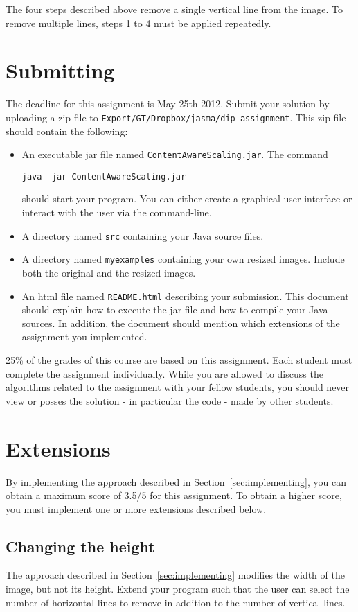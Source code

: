 \documentclass{article}
\begin{document}
The four steps described above remove a single vertical line from the image. To remove multiple lines, steps 1 to 4 must be applied repeatedly.

\section{Submitting}
The deadline for this assignment is May 25th 2012. Submit your solution by uploading a zip file to \texttt{Export/GT/Dropbox/jasma/dip-assignment}. This zip file should contain the following:
\begin{itemize}
  \item An executable jar file named \texttt{ContentAwareScaling.jar}. The command
\begin{verbatim}
java -jar ContentAwareScaling.jar
\end{verbatim}
should start your program. You can either create a graphical user interface or interact with the user via the command-line.
  \item A directory named \texttt{src} containing your Java source files.
  \item A directory named \texttt{myexamples} containing your own resized images. Include both the original and the resized images. 
  \item An html file named \texttt{README.html} describing your submission. This document should explain how to execute the jar file and how to compile your Java sources. In addition, the document should mention which extensions of the assignment you implemented. 
\end{itemize}

25\% of the grades of this course are based on this assignment. Each student must complete the assignment individually. While you are allowed to discuss the algorithms related to the assignment with your fellow students, you should never view or posses the solution - in particular the code - made by other students.

\section{Extensions}
By implementing the approach described in Section~\ref{sec:implementing}, you can obtain a maximum score of 3.5/5 for this assignment. To obtain a higher score, you must implement one or more extensions described below. 

\subsection*{Changing the height}
The approach described in Section~\ref{sec:implementing} modifies the width of the image, but not its height. Extend your program such that the user can select the number of horizontal lines to remove in addition to the number of vertical lines.
\end{document}
